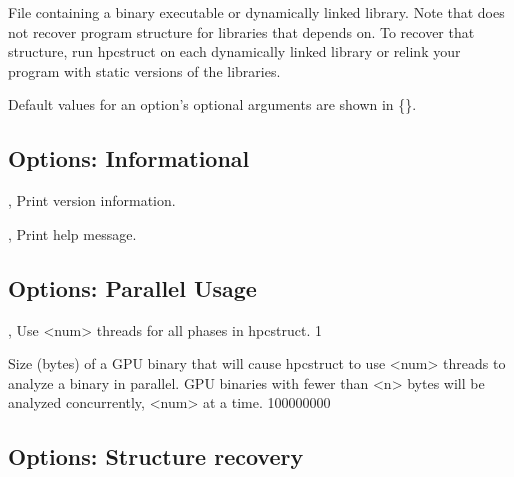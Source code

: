 \documentclass[english]{article}
\begin{document}

\begin{Description}
\item[\Arg{binary}] File containing a binary executable or dynamically linked library.
Note that  does not recover program structure for libraries that  depends on.
To recover that structure, run hpcstruct on each dynamically linked library
or relink your program with static versions of the libraries.
\end{Description}

Default values for an option's optional arguments are shown in \{\}.

\subsection{Options: Informational}

\begin{Description}

\item[\Opt{-V}, \Opt{--version}]
Print version information.

\item[\Opt{-h}, \Opt{--help}]
Print help message.

\end{Description}

\subsection{Options: Parallel Usage}
\item[\OptArg{-j}{num}, \OptArg{--jobs}{num}]
Use <num> threads for all phases in hpcstruct. {1}

\item[\OptArg{--gpu-size}{n}]
Size (bytes) of a GPU binary that will cause hpcstruct
to use <num> threads to analyze a binary in parallel.
GPU binaries with fewer than <n> bytes will be analyzed
concurrently, <num> at a time.  {100000000}

\subsection{Options: Structure recovery}
\end{document}
